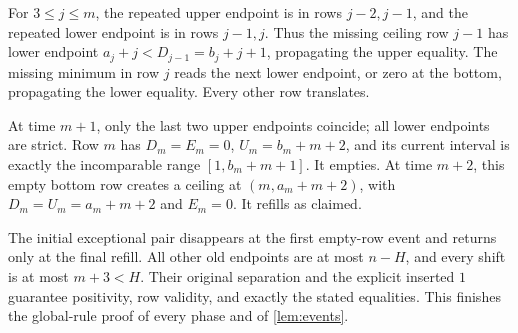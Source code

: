 For $3\le j\le m$, the repeated upper endpoint is in rows $j-2,j-1$, and the repeated lower endpoint is in rows $j-1,j$. Thus the missing ceiling row $j-1$ has lower endpoint $a_j+j<D_{j-1}=b_j+j+1$, propagating the upper equality. The missing minimum in row $j$ reads the next lower endpoint, or zero at the bottom, propagating the lower equality. Every other row translates.

At time $m+1$, only the last two upper endpoints coincide; all lower endpoints are strict. Row $m$ has $D_m=E_m=0$, $U_m=b_m+m+2$, and its current interval is exactly the incomparable range $[1,b_m+m+1]$. It empties. At time $m+2$, this empty bottom row creates a ceiling at $(m,a_m+m+2)$, with $D_m=U_m=a_m+m+2$ and $E_m=0$. It refills as claimed.

The initial exceptional pair disappears at the first empty-row event and returns only at the final refill. All other old endpoints are at most $n-H$, and every shift is at most $m+3<H$. Their original separation and the explicit inserted $1$ guarantee positivity, row validity, and exactly the stated equalities. This finishes the global-rule proof of every phase and of \cref{lem:events}.
